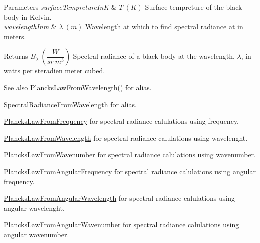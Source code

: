 \begin{DoxyParams}{Parameters}
{\em surface\+Tempreture\+InK} & $T\ (K)$ Surface tempreture of the black body in Kelvin. \\
\hline
{\em wavelength\+Inm} & $\lambda\ (m)$ Wavelength at which to find spectral radiance at in meters. \\
\hline
\end{DoxyParams}
\begin{DoxyReturn}{Returns}
$B_{\lambda}\ ( \dfrac{W}{sr\ m^3})$ Spectral radiance of a black body at the wavelength, $\lambda$, in watts per steradien meter cubed. 
\end{DoxyReturn}
\begin{DoxySeeAlso}{See also}
\mbox{\hyperlink{group___e_g_x_phys-_electrodynamics-_black_body-_plancks_law_ga54639bc031ded51ef78aa82b0457a4dd}{Plancks\+Law\+From\+Wavelength()}} for alias. 

Spectral\+Radiance\+From\+Wavelength for alias. 

\mbox{\hyperlink{group___e_g_x_phys-_electrodynamics-_black_body-_plancks_law_ga68aae82f8a086831358c4a61c8c80ba4}{Plancks\+Law\+From\+Frequency}} for spectral radiance calulations using frequency. 

\mbox{\hyperlink{group___e_g_x_phys-_electrodynamics-_black_body-_plancks_law_ga54639bc031ded51ef78aa82b0457a4dd}{Plancks\+Law\+From\+Wavelength}} for spectral radiance calulations using wavelenght. 

\mbox{\hyperlink{group___e_g_x_phys-_electrodynamics-_black_body-_plancks_law_ga6648ae2a0fbff6735c1e1a04c7cac746}{Plancks\+Law\+From\+Wavenumber}} for spectral radiance calulations using wavenumber. 

\mbox{\hyperlink{group___e_g_x_phys-_electrodynamics-_black_body-_plancks_law_gaac540560c71e30c02b91d22e417b5863}{Plancks\+Law\+From\+Angular\+Frequency}} for spectral radiance calulations using angular frequency. 

\mbox{\hyperlink{group___e_g_x_phys-_electrodynamics-_black_body-_plancks_law_ga7322124727f968d28807e918c5eeb23f}{Plancks\+Law\+From\+Angular\+Wavelength}} for spectral radiance calulations using angular wavelenght. 

\mbox{\hyperlink{group___e_g_x_phys-_electrodynamics-_black_body-_plancks_law_gaa3d3e0fdb77d25bdd40523f9975de902}{Plancks\+Law\+From\+Angular\+Wavenumber}} for spectral radiance calulations using angular wavenumber. 
\end{DoxySeeAlso}
\mbox{\label{group___e_g_x_phys-_electrodynamics-_black_body-_plancks_law_gaac540560c71e30c02b91d22e417b5863}} 
